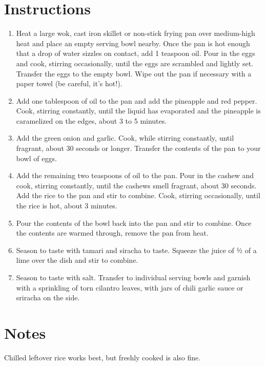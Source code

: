 \documentclass[ansiapaper,10pt,english]{sphinxmanual}
\begin{document}
\section{Instructions}
\label{\detokenize{PFR:instructions}}\begin{enumerate}
\item {} 
Heat a large wok, cast iron skillet or non-stick frying pan over medium-high heat and place an empty serving bowl nearby. Once the pan is hot enough that a drop of water sizzles on contact, add 1 teaspoon oil. Pour in the eggs and cook, stirring occasionally, until the eggs are scrambled and lightly set. Transfer the eggs to the empty bowl. Wipe out the pan if necessary with a paper towel (be careful, it’s hot!).

\item {} 
Add one tablespoon of oil to the pan and add the pineapple and red pepper. Cook, stirring constantly, until the liquid has evaporated and the pineapple is caramelized on the edges, about 3 to 5 minutes.

\item {} 
Add the green onion and garlic. Cook, while stirring constantly, until fragrant, about 30 seconds or longer. Transfer the contents of the pan to your bowl of eggs.

\item {} 
Add the remaining two teaspoons of oil to the pan. Pour in the cashew and cook, stirring constantly, until the cashews smell fragrant, about 30 seconds. Add the rice to the pan and stir to combine. Cook, stirring occasionally, until the rice is hot, about 3 minutes.

\item {} 
Pour the contents of the bowl back into the pan and stir to combine. Once the contents are warmed through, remove the pan from heat.

\item {} 
Season to taste with tamari and siracha to taste. Squeeze the juice of ½ of a lime over the dish and stir to combine.

\item {} 
Season to taste with salt. Transfer to individual serving bowls and garnish with a sprinkling of torn cilantro leaves, with jars of chili garlic sauce or sriracha on the side.

\end{enumerate}


\section{Notes}
\label{\detokenize{PFR:notes}}
Chilled leftover rice works best, but freshly cooked is also fine.
\end{document}
